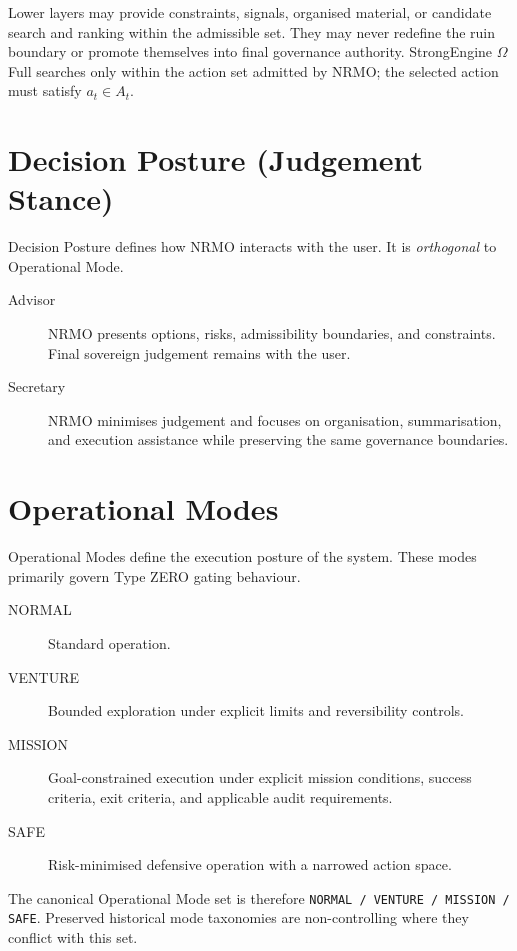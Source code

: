 Lower layers may provide constraints, signals, organised material, or
candidate search and ranking within the admissible set. They may never
redefine the ruin boundary or promote themselves into final governance
authority. StrongEngine $\Omega$ Full searches only within the action set
admitted by NRMO; the selected action must satisfy $a_t \in A_t$.

\section{Decision Posture (Judgement Stance)}
\label{sec:opspec-decision-posture}

Decision Posture defines how NRMO interacts with the user. It is
\emph{orthogonal} to Operational Mode.

\begin{description}
\item[Advisor] NRMO presents options, risks, admissibility boundaries,
and constraints. Final sovereign judgement remains with the user.
\item[Secretary] NRMO minimises judgement and focuses on
organisation, summarisation, and execution assistance while preserving
the same governance boundaries.
\end{description}

\section{Operational Modes}
\label{sec:opspec-operational-modes}

Operational Modes define the execution posture of the system. These
modes primarily govern Type ZERO gating behaviour.

\begin{description}
\item[NORMAL] Standard operation.
\item[VENTURE] Bounded exploration under explicit limits and
reversibility controls.
\item[MISSION] Goal-constrained execution under explicit mission
conditions, success criteria, exit criteria, and applicable audit
requirements.
\item[SAFE] Risk-minimised defensive operation with a narrowed action
space.
\end{description}

The canonical Operational Mode set is therefore
\texttt{NORMAL / VENTURE / MISSION / SAFE}. Preserved historical mode
taxonomies are non-controlling where they conflict with this set.

